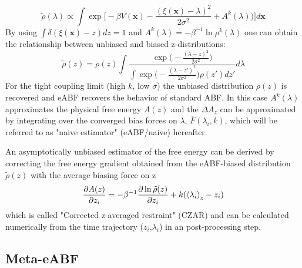 \begin{equation}
  \tilde{\rho}(\lambda) \propto \int \exp \biggl[-\beta V(\textbf{x})-\frac{(\xi(\textbf{x})-\lambda)^2}{2\sigma^2} + A^{k}(\lambda) \biggr) \biggr] d\textbf{x}
\end{equation}
By using $\int \delta(\xi(\textbf{x})-z)dz=1$ and $A^k(\lambda)=-\beta^{-1}\ln\rho^k(\lambda)$ one can obtain the relationship between unbiased and biased z-distributions:
\begin{equation}
  \tilde{\rho}(z) =  \rho(z) \int \frac{\exp \bigl(-\frac{(\lambda-z)^2}{2\sigma^2}\bigr)}
  {\int \exp\bigl(-\frac{(\lambda-z')^2}{2\sigma^2}\bigr)\rho(z')dz'} d\lambda
\end{equation}
For the tight coupling limit (high $k$, low $\sigma$) the unbiased distribution $\rho(z)$ is recovered and eABF recovers the behavior of standard ABF.
In this case $A^k(\lambda)$  approximates the physical free energy $A(z)$ and the $\Delta A_{z}$ can be approximated by integrating over the converged bias forces on $\lambda$, $\overline{F}(\lambda_{i}, k)$, which will be referred to as "naive estimator" (eABF/naive) hereafter.

An asymptotically unbiased estimator of the free energy can be derived by correcting the free energy gradient obtained from the eABF-biased distribution $\tilde{\rho}(z)$ with the average biasing force on z
\begin{equation}
  \frac{\partial A(z)}{\partial z_i} = -\beta^{-1}\frac{\partial \ln \tilde{\rho}(z)}{\partial z_i} + k(\braket{\lambda_i}_{z}-z_{i})
\end{equation}
which is called "Corrected z-averaged restraint" (CZAR) and can be calculated numerically from the time trajectory ($z_i$,$\lambda_i$) in an post-processing step.\autocite{lesage2017smoothed}

\subsection{Meta-eABF}
\label{sec:meta-eABF}
